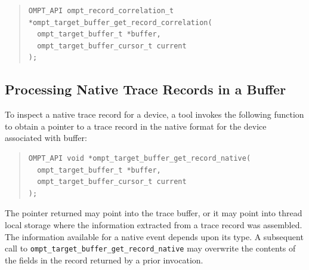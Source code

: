 \documentclass{article}
\begin{document}
\begin{quote}
\begin{verbatim}
OMPT_API ompt_record_correlation_t *ompt_target_buffer_get_record_correlation(
  ompt_target_buffer_t *buffer, 
  ompt_target_buffer_cursor_t current
);
\end{verbatim}
\end{quote}

\subsection{Processing Native Trace Records in a Buffer}
\label{sec:native-record-data}

To inspect a native trace record for a device, a tool invokes the following function to obtain a pointer to a trace record in the native format for the device associated with buffer:
\begin{quote}
\begin{verbatim}
OMPT_API void *ompt_target_buffer_get_record_native(
  ompt_target_buffer_t *buffer, 
  ompt_target_buffer_cursor_t current
);
\end{verbatim}
\end{quote}
The pointer returned  may point into the trace buffer, or it may point into thread local storage where the information extracted from a trace record was assembled. The information available for a native event depends upon its type. 
A subsequent call to \verb|ompt_target_buffer_get_record_native| may overwrite the contents of the fields in the record returned by a prior invocation.
\end{document}
